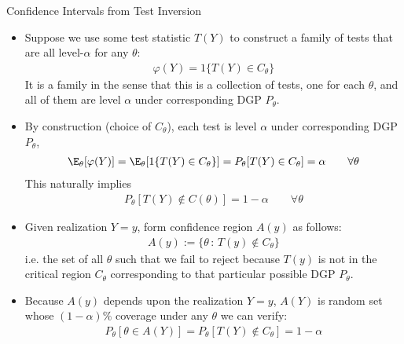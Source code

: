 \documentclass[aspectratio=169, handout]{beamer}
\begin{document}
{\scriptsize
\begin{frame}{Confidence Intervals from Test Inversion}
\begin{itemize}
  \item
    Suppose we use some test statistic $T(Y)$ to construct a
    \alert{family of tests} that are all level-$\alpha$ for any
    $\theta$:
    \vspace{-10pt}
    \begin{align*}
      \varphi(Y)
      = {1}\{T(Y)\in C_\theta\}
    \end{align*}
    It is a family in the sense that this is a collection of tests, one
    for each $\theta$, and all of them are level $\alpha$ under
    corresponding DGP $P_\theta$.

  \pause
  \item
    By construction (choice of $C_\theta$), each test is level $\alpha$
    under corresponding DGP $P_{\theta}$,
    \begin{align*}
      \E_\theta[\varphi(Y)]
      = \E_\theta[{1}\{T(Y)\in C_\theta\}]
      = P_\theta[T(Y)\in C_\theta]
      = \alpha
      \qquad
      \forall\theta
    \end{align*}
    This naturally implies
    \vspace{-10pt}
    \begin{align*}
      P_\theta[T(Y)\not\in C(\theta)]
      = 1-\alpha
      \qquad
      \forall \theta
    \end{align*}

  \item
    Given realization $Y=y$, form confidence region
    $A(y)$ as follows:
    \begin{align*}
      A(y)
      :=
      \{\theta\,:\,T(y)\not\in C_\theta\}
    \end{align*}
    i.e. the set of all $\theta$ such that we fail to reject because
    $T(y)$ is not in the critical region $C_\theta$ corresponding to
    that particular possible DGP $P_\theta$.

  \item
    Because $A(y)$ depends upon the realization $Y=y$, $A(Y)$ is random
    set whose $(1-\alpha)\%$ coverage under any $\theta$
    we can verify:
    \begin{align*}
      P_\theta[\theta\in A(Y)]
      =
      P_\theta[T(Y)\not\in C_\theta]
      =
      1-\alpha
    \end{align*}


\end{itemize}
\end{frame}
}
\end{document}
